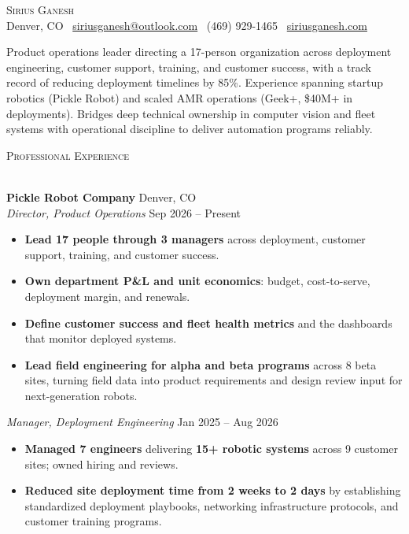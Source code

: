 \documentclass[letterpaper]{article}
\newcommand{\lineunder} {
    \vspace*{-8pt} \\
    \hspace*{-18pt} \hrulefill \\
}
\newcommand{\header} [1] {
    {\hspace*{-18pt}\vspace*{6pt} \fontsize{12pt}{14pt}\selectfont\textsc{#1}}
    \vspace*{-6pt} \lineunder
}
\begin{document}
\vspace*{-45pt}

\vspace*{-15pt}
\begin{center}
    {\Huge \scshape {Sirius Ganesh}}\\
    \vspace{1mm}
    Denver, CO \textbar\ \href{mailto:siriusganesh@outlook.com}{siriusganesh@outlook.com} \textbar\ (469) 929-1465 \textbar\ \href{https://siriusganesh.com}{siriusganesh.com}
\end{center}
\vspace{-2mm}
Product operations leader directing a 17-person organization across deployment engineering, customer support, training, and customer success, with a track record of reducing deployment timelines by 85\%. Experience spanning startup robotics (Pickle Robot) and scaled AMR operations (Geek+, \$40M+ in deployments). Bridges deep technical ownership in computer vision and fleet systems with operational discipline to deliver automation programs reliably.
\vspace{2mm}

\header{Professional Experience}
\vspace{0mm}

\textbf{Pickle Robot Company} \hfill Denver, CO \\
\textit{Director, Product Operations} \hfill Sep 2026 -- Present\\
\vspace{-2mm}
\begin{itemize} \itemsep 1pt
    \item \textbf{Lead 17 people through 3 managers} across deployment, customer support, training, and customer success.
    \item \textbf{Own department P\&L and unit economics}: budget, cost-to-serve, deployment margin, and renewals.
    \item \textbf{Define customer success and fleet health metrics} and the dashboards that monitor deployed systems.
    \item \textbf{Lead field engineering for alpha and beta programs} across 8 beta sites, turning field data into product requirements and design review input for next-generation robots.
\end{itemize}
\vspace{-2mm}
\noindent \textit{Manager, Deployment Engineering} \hfill Jan 2025 -- Aug 2026\\
\vspace{-2mm}
\begin{itemize} \itemsep 1pt
    \item \textbf{Managed 7 engineers} delivering \textbf{15+ robotic systems} across 9 customer sites; owned hiring and reviews.
    \item \textbf{Reduced site deployment time from 2 weeks to 2 days} by establishing standardized deployment playbooks, networking infrastructure protocols, and customer training programs.
\end{itemize}
\vspace{1mm}
\end{document}
